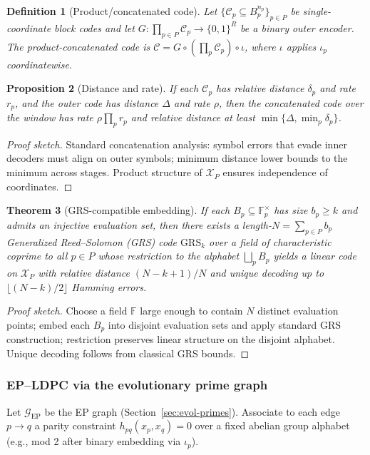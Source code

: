 \documentclass[12pt]{article}
\newtheorem{theorem}{Theorem}[section]
\newtheorem{proposition}[theorem]{Proposition}
\newtheorem{definition}[theorem]{Definition}
\numberwithin{equation}{section}
\begin{document}
\begin{definition}[Product/concatenated code]
Let $\{\mathcal{C}_p\subseteq B_p^{n_p}\}_{p\in P}$ be single-coordinate block codes and let $G:\prod_{p\in P} \mathcal{C}_p\to \{0,1\}^R$ be a binary outer encoder. The \emph{product-concatenated} code is $\mathcal{C}=G\circ (\prod_p \mathcal{C}_p)\circ \iota$, where $\iota$ applies $\iota_p$ coordinatewise.
\end{definition}

\begin{proposition}[Distance and rate]
If each $\mathcal{C}_p$ has relative distance $\delta_p$ and rate $r_p$, and the outer code has distance $\Delta$ and rate $\rho$, then the concatenated code over the window has rate $\rho\prod_{p} r_p$ and relative distance at least $\min\{\Delta,\min_p \delta_p\}$.
\end{proposition}

\begin{proof}[Proof sketch]
Standard concatenation analysis: symbol errors that evade inner decoders must align on outer symbols; minimum distance lower bounds to the minimum across stages. Product structure of $\mathscr{X}_P$ ensures independence of coordinates.
\end{proof}

\begin{theorem}[GRS-compatible embedding]
If each $B_p\subseteq \mathbb{F}_p^{\times}$ has size $b_p\ge k$ and admits an injective evaluation set, then there exists a length-$N=\sum_{p\in P} b_p$ Generalized Reed–Solomon (GRS) code $\mathrm{GRS}_k$ over a field of characteristic coprime to all $p\in P$ whose restriction to the alphabet $\bigsqcup_p B_p$ yields a linear code on $\mathscr{X}_P$ with relative distance $(N-k+1)/N$ and unique decoding up to $\lfloor (N-k)/2\rfloor$ Hamming errors.
\end{theorem}

\begin{proof}[Proof sketch]
Choose a field $\mathbb{F}$ large enough to contain $N$ distinct evaluation points; embed each $B_p$ into disjoint evaluation sets and apply standard GRS construction; restriction preserves linear structure on the disjoint alphabet. Unique decoding follows from classical GRS bounds.
\end{proof}

\subsubsection{EP–LDPC via the evolutionary prime graph}\label{subsec:C4-ep-ldpc}
Let $\mathcal{G}_{\!\mathrm{EP}}$ be the EP graph (Section~\ref{sec:evol-primes}). Associate to each edge $p\to q$ a parity constraint $h_{pq}(x_p,x_q)=0$ over a fixed abelian group alphabet (e.g., mod 2 after binary embedding via $\iota_p$).
\end{document}
